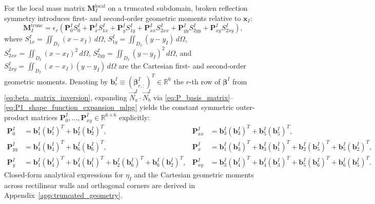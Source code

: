 \documentclass[VANCOUVER,Times1COL]{WileyNJD-v5}
\begin{document}
For the local mass matrix $\mathbf{M}_I^{\mathrm{local}}$ on a truncated subdomain, broken reflection symmetry introduces first- and second-order geometric moments relative to $\mathbf{x}_I$:
\begin{equation}
    \mathbf{M}_I^{\mathrm{trunc}} = \epsilon_r \left( \mathbf{P}_0^I S_0^I + \mathbf{P}_x^I S_{1x}^I + \mathbf{P}_y^I S_{1y}^I + \mathbf{P}_{xx}^I S_{2xx}^I + \mathbf{P}_{yy}^I S_{2yy}^I + \mathbf{P}_{xy}^I S_{2xy}^I \right),
    \label{eq:m_truncated_moments}
\end{equation}
where $S_{1x}^I = \iint_{D_I} (x - x_I)\,d\Omega$, $S_{1y}^I = \iint_{D_I} (y - y_I)\,d\Omega$, $S_{2xx}^I = \iint_{D_I} (x - x_I)^2\,d\Omega$, $S_{2yy}^I = \iint_{D_I} (y - y_I)^2\,d\Omega$, and $S_{2xy}^I = \iint_{D_I} (x - x_I)(y - y_I)\,d\Omega$ are the Cartesian first- and second-order geometric moments. Denoting by $\mathbf{b}_r^I \equiv (\boldsymbol{\beta}_{r,:}^I)^T \in \mathbb{R}^6$ the $r$-th row of $\boldsymbol{\beta}^I$ from \eqref{eq:beta_matrix_inversion}, expanding $\vec{N}_a^I \cdot \vec{N}_b^I$ via \eqref{eq:P_basis_matrix}--\eqref{eq:P1_shape_function_expansion_mlpg} yields the constant symmetric outer-product matrices $\mathbf{P}_0^I, \dots, \mathbf{P}_{xy}^I \in \mathbb{R}^{6 \times 6}$ explicitly:
\begin{equation}
    \begin{aligned}
        \mathbf{P}_0^I    & = \mathbf{b}_1^I (\mathbf{b}_1^I)^T + \mathbf{b}_2^I (\mathbf{b}_2^I)^T, &
        \mathbf{P}_{xx}^I & = \mathbf{b}_3^I (\mathbf{b}_3^I)^T + \mathbf{b}_5^I (\mathbf{b}_5^I)^T, \\
        \mathbf{P}_{yy}^I & = \mathbf{b}_4^I (\mathbf{b}_4^I)^T + \mathbf{b}_6^I (\mathbf{b}_6^I)^T, &
        \mathbf{P}_x^I    & = \mathbf{b}_1^I (\mathbf{b}_3^I)^T + \mathbf{b}_3^I (\mathbf{b}_1^I)^T + \mathbf{b}_2^I (\mathbf{b}_5^I)^T + \mathbf{b}_5^I (\mathbf{b}_2^I)^T, \\
        \mathbf{P}_y^I    & = \mathbf{b}_1^I (\mathbf{b}_4^I)^T + \mathbf{b}_4^I (\mathbf{b}_1^I)^T + \mathbf{b}_2^I (\mathbf{b}_6^I)^T + \mathbf{b}_6^I (\mathbf{b}_2^I)^T, &
        \mathbf{P}_{xy}^I & = \mathbf{b}_3^I (\mathbf{b}_4^I)^T + \mathbf{b}_4^I (\mathbf{b}_3^I)^T + \mathbf{b}_5^I (\mathbf{b}_6^I)^T + \mathbf{b}_6^I (\mathbf{b}_5^I)^T.
    \end{aligned}
    \label{eq:P_outer_products}
\end{equation}
Closed-form analytical expressions for $\eta_I$ and the Cartesian geometric moments across rectilinear walls and orthogonal corners are derived in Appendix~\ref{app:truncated_geometry}.
\end{document}
